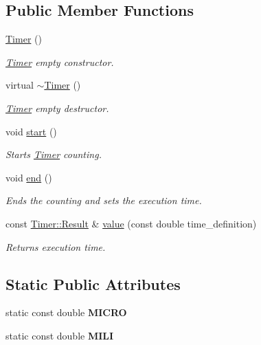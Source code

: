 \subsection*{Public Member Functions}
\begin{DoxyCompactItemize}
\item 
\hypertarget{classTimer_a5f16e8da27d2a5a5242dead46de05d97}{\hyperlink{classTimer_a5f16e8da27d2a5a5242dead46de05d97}{Timer} ()}\label{classTimer_a5f16e8da27d2a5a5242dead46de05d97}

\begin{DoxyCompactList}\small\item\em \hyperlink{classTimer}{Timer} empty constructor. \end{DoxyCompactList}\item 
\hypertarget{classTimer_ad3c95ce902fce977d280256256856d64}{virtual \hyperlink{classTimer_ad3c95ce902fce977d280256256856d64}{$\sim$\-Timer} ()}\label{classTimer_ad3c95ce902fce977d280256256856d64}

\begin{DoxyCompactList}\small\item\em \hyperlink{classTimer}{Timer} empty destructor. \end{DoxyCompactList}\item 
void \hyperlink{classTimer_a3a8b5272198d029779dc9302a54305a8}{start} ()
\begin{DoxyCompactList}\small\item\em Starts \hyperlink{classTimer}{Timer} counting. \end{DoxyCompactList}\item 
void \hyperlink{classTimer_accef2f2b25869fbca2947a56b494d2a0}{end} ()
\begin{DoxyCompactList}\small\item\em Ends the counting and sets the execution time. \end{DoxyCompactList}\item 
const \hyperlink{classTimer_1_1Result}{Timer\-::\-Result} \& \hyperlink{classTimer_a8a8f26ec48ce04dc4b87b88b6e789fea}{value} (const double time\-\_\-definition)
\begin{DoxyCompactList}\small\item\em Returns execution time. \end{DoxyCompactList}\end{DoxyCompactItemize}
\subsection*{Static Public Attributes}
\begin{DoxyCompactItemize}
\item 
\hypertarget{classTimer_a34f60ca96ff5a7f7e1f9c808642c102d}{static const double {\bfseries M\-I\-C\-R\-O}}\label{classTimer_a34f60ca96ff5a7f7e1f9c808642c102d}

\item 
\hypertarget{classTimer_a6dc3788aafa58a3b9449a5ca37c780bf}{static const double {\bfseries M\-I\-L\-I}}\label{classTimer_a6dc3788aafa58a3b9449a5ca37c780bf}

\end{DoxyCompactItemize}


